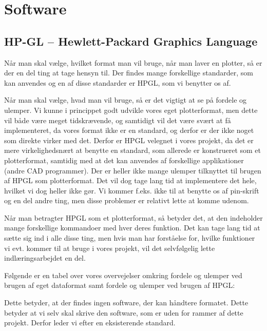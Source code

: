 \chapter{Software}


\section{HP-GL -- Hewlett-Packard Graphics Language}

Når man skal vælge, hvilket format man vil bruge, når man laver en
plotter, så er der en del ting at tage hensyn til. Der findes mange
forskellige standarder, som kan anvendes og en af disse standarder er
HPGL, som vi benytter os af.

Når man skal vælge, hvad man vil bruge, så er det vigtigt at se på
fordele og ulemper. Vi kunne i princippet godt udvikle vores eget
plotterformat, men dette vil både være meget tidskrævende, og
samtidigt vil det være svært at få implementeret, da vores format ikke
er en standard, og derfor er der ikke noget som direkte virker med
det. Derfor er HPGL velegnet i vores projekt, da det er mere
virkelighedsnært at benytte en standard, som allerede er konstrueret
som et plotterformat, samtidig med at det kan anvendes af forskellige
applikationer (andre CAD programmer). Der er heller ikke mange ulemper
tilknyttet til brugen af HPGL som plotterformat. Det vil dog tage lang
tid at implementere det hele, hvilket vi dog heller ikke gør. Vi
kommer f.eks. ikke til at benytte os af pin-skrift og en del andre
ting, men disse problemer er relativt lette at komme udenom.

Når man betragter HPGL som et plotterformat, så betyder det, at den
indeholder mange forskellige kommandoer med hver deres funktion. Det
kan tage lang tid at sætte sig ind i alle disse ting, men hvis man har
forståelse for, hvilke funktioner vi evt. kommer til at bruge i vores
projekt, vil det selvfølgelig lette indlæringsarbejdet en del.

Følgende er en tabel over vores overvejelser omkring fordele og
ulemper ved brugen af eget dataformat samt fordele og ulemper ved
brugen af HPGL:


Dette betyder, at der findes ingen software, der kan håndtere
formatet. Dette betyder at vi selv skal skrive den software, som er
uden for rammer af dette projekt. Derfor leder vi efter en
eksisterende standard.

